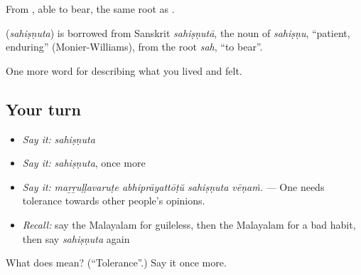 From , able to bear, the same root as .

\begin{cousinweb}
\textbf{} (\emph{sahiṣṇuta}) is borrowed from Sanskrit \emph{sahiṣṇutā}, the noun of \emph{sahiṣṇu}, \textquotedblleft{}patient, enduring\textquotedblright{} (Monier-Williams), from the root \emph{sah}, \textquotedblleft{}to bear\textquotedblright{}.
\end{cousinweb}

\begin{grammarlens}[title={What you've built}]
One more word for describing what you lived and felt.
\end{grammarlens}

\subsection*{Your turn}
\begin{itemize}
\raggedright
  \item \emph{Say it:} \emph{sahiṣṇuta}
  \item \emph{Say it:} \emph{sahiṣṇuta}, once more
  \item \emph{Say it:} \emph{maṟṟuḷḷavaruṭe abhiprāyattōṭŭ sahiṣṇuta vēṇaṁ.} — One needs tolerance towards other people's opinions.
  \item \emph{Recall:} say the Malayalam for guileless, then the Malayalam for a bad habit, then say \emph{sahiṣṇuta} again
\end{itemize}

\begin{tcolorbox}[breakable,colback=teal!4,colframe=teal!35!black,title={Before you move on}]
What does  mean? (\textquotedblleft{}Tolerance\textquotedblright{}.) Say it once more.
\end{tcolorbox}
